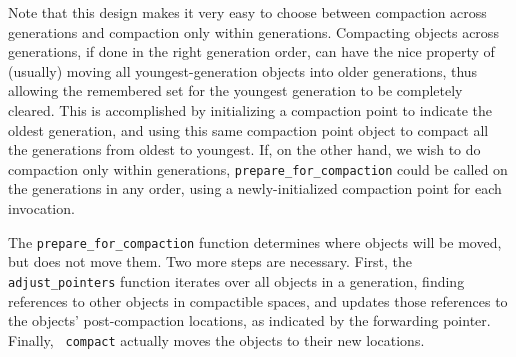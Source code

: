 \documentclass{article}
\begin{document}
Note that this design makes it very easy to choose between compaction
across generations and compaction only within generations.  Compacting
objects across generations, if done in the right generation order, can
have the nice property of (usually) moving all youngest-generation objects
into older generations, thus allowing the remembered set for the
youngest generation to be completely cleared.  This is accomplished by
initializing a compaction point to indicate the oldest generation, and
using this same compaction point object to compact all the generations
from oldest to youngest.  If, on the other hand, we wish to do
compaction only within generations, {\tt prepare\_for\_compaction} could
be called on the generations in any order, using a newly-initialized
compaction point for each invocation.

The {\tt prepare\_for\_compaction} function determines where objects
will be moved, but does not move them.  Two more steps are
necessary.  First, the {\tt adjust\_pointers} function iterates over all objects in
a generation, finding references to other objects in compactible spaces,
and updates those references to the objects' post-compaction
locations, as indicated by the forwarding pointer.    Finally, {\tt
compact} actually moves the objects to their new locations.

\end{document}

